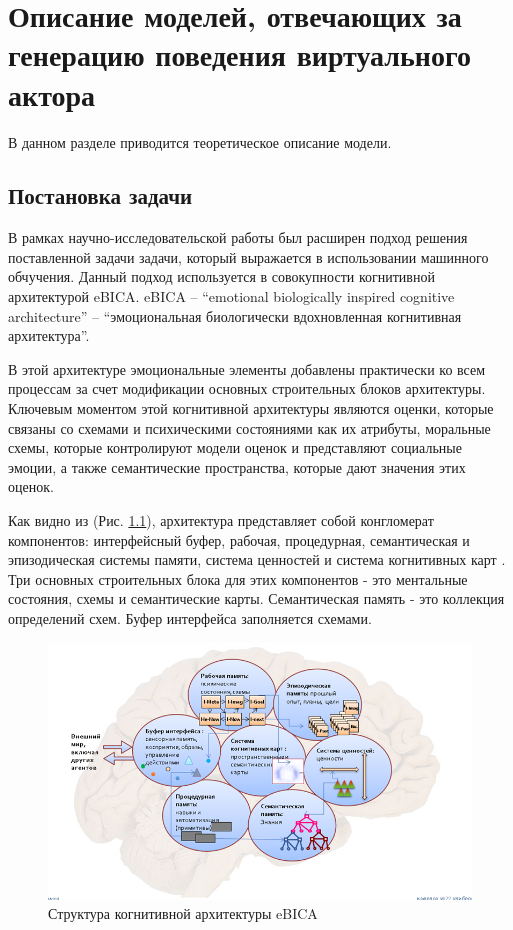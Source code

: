 \chapter{Описание моделей, отвечающих за генерацию поведения виртуального актора}


В данном разделе приводится теоретическое описание модели.

\section{Постановка задачи}

В рамках научно-исследовательской работы был расширен подход решения поставленной задачи задачи, который выражается в
использовании машинного обчучения. Данный подход используется в совокупности когнитивной архитектурой eBICA. 
eBICA – “emotional biologically inspired cognitive architecture” – “эмоциональная биологически вдохновленная когнитивная архитектура”. 

В этой архитектуре эмоциональные элементы добавлены практически ко всем процессам за счет модификации основных строительных блоков архитектуры. 
Ключевым моментом этой когнитивной архитектуры являются оценки, которые связаны со схемами и психическими состояниями как их атрибуты, 
моральные схемы, которые контролируют модели оценок и представляют социальные эмоции, а также семантические пространства, которые дают 
значения этих оценок.

Как видно из (Рис. \ref{pic:ris7}), архитектура представляет собой конгломерат компонентов: интерфейсный буфер, рабочая, процедурная, семантическая 
и эпизодическая системы памяти, система ценностей и система когнитивных карт \cite{Samsonovich01}. Три основных строительных блока для этих компонентов - это 
ментальные состояния, схемы и семантические карты. Семантическая память - это коллекция определений схем. Буфер интерфейса заполняется схемами.

\begin{figure}[h]
\includegraphics[width=0.75\columnwidth]{./img/ris7.png}
\centering  
\caption{Структура когнитивной архитектуры eBICA}
\label{pic:ris7}
\end{figure}

